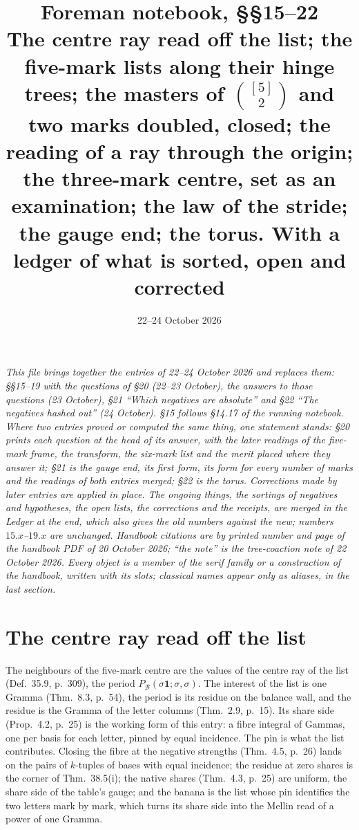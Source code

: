 \documentclass[11pt]{article}
\title{Foreman notebook, \S\S15--22\\[4pt]\large The centre ray read off the list; the five-mark lists along their hinge trees; the masters of $\binom{[5]}2$ and two marks doubled, closed; the reading of a ray through the origin; the three-mark centre, set as an examination; the law of the stride; the gauge end; the torus. With a ledger of what is sorted, open and corrected}
\date{22--24 October 2026}
\author{}
\newcommand{\cB}{\mathcal B}
\newcommand{\one}{\mathbf 1}
\theoremstyle{plain}
\theoremstyle{definition}
\theoremstyle{remark}
\begin{document}
\maketitle

\noindent\emph{This file brings together the entries of 22--24 October 2026 and replaces them: \S\S15--19 with the questions of \S20 (22--23 October), the answers to those questions (23 October), \S21 ``Which negatives are absolute'' and \S22 ``The negatives hashed out'' (24 October). \S15 follows \S14.17 of the running notebook. Where two entries proved or computed the same thing, one statement stands: \S20 prints each question at the head of its answer, with the later readings of the five-mark frame, the transform, the six-mark list and the merit placed where they answer it; \S21 is the gauge end, its first form, its form for every number of marks and the readings of both entries merged; \S22 is the torus. Corrections made by later entries are applied in place. The ongoing things, the sortings of negatives and hypotheses, the open lists, the corrections and the receipts, are merged in the Ledger at the end, which also gives the old numbers against the new; numbers $15.x$--$19.x$ are unchanged. Handbook citations are by printed number and page of the handbook PDF of 20 October 2026; ``the note'' is the tree-coaction note of 22 October 2026. Every object is a member of the serif family or a construction of the handbook, written with its slots; classical names appear only as aliases, in the last section.}

{\small\tableofcontents}

\section{The centre ray read off the list}

The neighbours of the five-mark centre are the values of the centre ray of the list (Def.~35.9, p.~309), the period $P_{\cB}(\sigma\one;\sigma,\sigma)$. The interest of the list is one Gramma (Thm.~8.3, p.~54), the period is its residue on the balance wall, and the residue is the Gramma of the letter columns (Thm.~2.9, p.~15). Its share side (Prop.~4.2, p.~25) is the working form of this entry: a fibre integral of Gammas, one per basis for each letter, pinned by equal incidence. The pin is what the list contributes. Closing the fibre at the negative strengths (Thm.~4.5, p.~26) lands on the pairs of $k$-tuples of bases with equal incidence; the residue at zero shares is the corner of Thm.~38.5(i); the native shares (Thm.~4.3, p.~25) are uniform, the share side of the table's gauge; and the banana is the list whose pin identifies the two letters mark by mark, which turns its share side into the Mellin read of a power of one Gramma.
\end{document}
